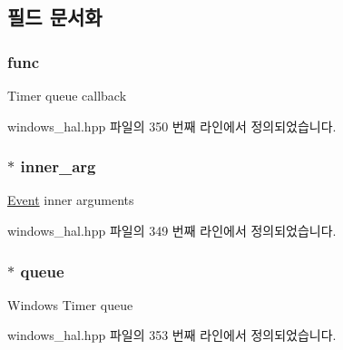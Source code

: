 \subsection{필드 문서화}
\subsubsection[{\texorpdfstring{func}{func}}]{ func}\hypertarget{struct_windows_timer_queue_handler_arg_aaa1ebdc5351c8e4b6cd0b92aabfa4d52}{}\label{struct_windows_timer_queue_handler_arg_aaa1ebdc5351c8e4b6cd0b92aabfa4d52}
Timer queue callback 

windows\+\_\+hal.\+hpp 파일의 350 번째 라인에서 정의되었습니다.

\subsubsection[{\texorpdfstring{inner\+\_\+arg}{inner_arg}}]{$\ast$ inner\+\_\+arg}\hypertarget{struct_windows_timer_queue_handler_arg_afc701b8a5b43cd1d29422c68856bc614}{}\label{struct_windows_timer_queue_handler_arg_afc701b8a5b43cd1d29422c68856bc614}
\hyperlink{class_event}{Event} inner arguments 

windows\+\_\+hal.\+hpp 파일의 349 번째 라인에서 정의되었습니다.

\subsubsection[{\texorpdfstring{queue}{queue}}]{$\ast$ queue}\hypertarget{struct_windows_timer_queue_handler_arg_a3aa628a0d9ac623a379f3bcaf5f937c3}{}\label{struct_windows_timer_queue_handler_arg_a3aa628a0d9ac623a379f3bcaf5f937c3}
Windows Timer queue 

windows\+\_\+hal.\+hpp 파일의 353 번째 라인에서 정의되었습니다.

